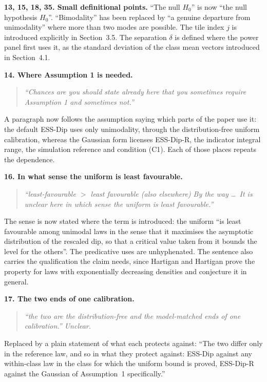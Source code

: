 \documentclass[11pt]{article}
\newcommand{\R}[1]{\medskip\noindent\textbf{#1}\quad}
\newenvironment{rquote}{\begin{quote}\itshape}{\end{quote}}
\begin{document}
\R{13, 15, 18, 35. Small definitional points.}
``The null $H_0$'' is now ``the null hypothesis $H_0$''. ``Bimodality'' has
been replaced by ``a genuine departure from unimodality'' where more than two
modes are possible. The tile index $j$ is introduced explicitly in Section~3.5.
The separation $\delta$ is defined where the power panel first uses it, as the
standard deviation of the class mean vectors introduced in Section~4.1.

\R{14. Where Assumption 1 is needed.}
\begin{rquote}
``Chances are you should state already here that you sometimes require
Assumption 1 and sometimes not.''
\end{rquote}
A paragraph now follows the assumption saying which parts of the paper use it:
the default ESS-Dip uses only unimodality, through the distribution-free
uniform calibration, whereas the Gaussian form licenses ESS-Dip-R, the
indicator integral range, the simulation reference and condition (C1). Each of
those places repeats the dependence.

\R{16. In what sense the uniform is least favourable.}
\begin{rquote}
``least-favourable $>$ least favourable (also elsewhere) By the way \dots\ It
is unclear here in which sense the uniform is least favourable.''
\end{rquote}
The sense is now stated where the term is introduced: the uniform ``is least
favourable among unimodal laws in the sense that it maximises the asymptotic
distribution of the rescaled dip, so that a critical value taken from it bounds
the level for the others''. The predicative uses are unhyphenated. The sentence also carries the
qualification the claim needs, since Hartigan and Hartigan prove the property
for laws with exponentially decreasing densities and conjecture it in general.

\R{17. The two ends of one calibration.}
\begin{rquote}
``the two are the distribution-free and the model-matched ends of one
calibration.'' Unclear.
\end{rquote}
Replaced by a plain statement of what each protects against: ``The two differ
only in the reference law, and so in what they protect against: ESS-Dip against
any within-class law in the class for which the uniform bound is proved,
ESS-Dip-R against the Gaussian of Assumption~1 specifically.''
\end{document}
